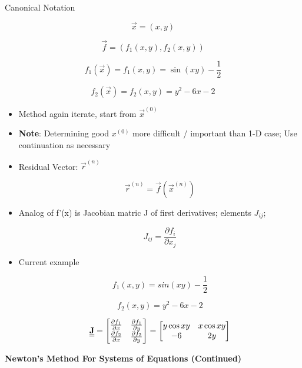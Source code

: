 Canonical Notation

\[\vec{x}= (x,y)\]

\[ \vec{f} = (f_1(x,y), f_2(x,y))\]

\[ f_1(\vec{x}) = f_1(x,y) = \sin(xy) - \frac{1}{2}\]

\[ f_2(\vec{x}) = f_2(x,y) = y^2 -6x -2 \]

\begin{itemize}
    \item Method again iterate, start from $\vec{x}^{(0)}$

    \item \textbf{Note}: Determining good $x^{(0)}$ more difficult / important than 1-D case;
    Use continuation as necessary
    \item Residual Vector: $\vec{r}^{(n)}$

    \begin{equation}
        \vec{r}^{(n)} = \vec{f}(\vec{x}^{(n)})
    \end{equation}

    \item Analog of f'(x) is Jacobian matric J of first derivatives; elements $J_{ij}$;

    \begin{equation}
        J_{ij} = \frac{\partial f_i}{\partial x_j}
    \end{equation}

    \item Current example

    \[ f_1(x,y) = sin(xy) - \frac{1}{2}\]

    \[ f_2(x,y) = y^2 - 6x -2\]

    \[ \textbf{\underline{\underline{J}}} = \begin{bmatrix}
\frac{\partial f_1}{\partial x} & \frac{\partial f_1}{\partial y} \\

\frac{\partial f_2}{\partial x} & \frac{\partial f_2}{\partial y}
\end{bmatrix} = \begin{bmatrix}
 y \cos{xy} & x\cos{xy} \\
-6 & 2y 
\end{bmatrix}\]
\end{itemize}

\textbf{Newton's Method For Systems of Equations (Continued)}

